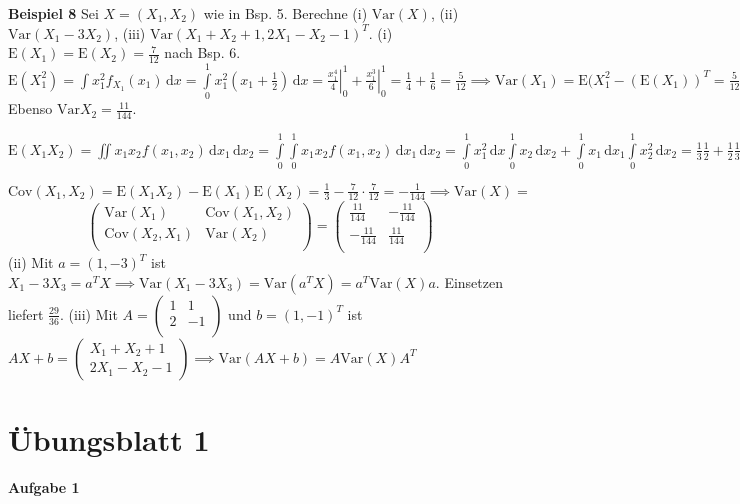 \documentclass[12pt, a4paper]{article}
\newcommand{\E}{\mbox{I\negthinspace E}}
\theoremstyle{empty}
\newcommand{\1}{\mathds{1}}
\renewcommand{\E}{\mathrm{E}}
\newcommand{\Var}{\mathrm{Var}}
\newcommand{\Cov}{\mathrm{Cov}}
\renewcommand{\d}{\,\mathrm{d}}
\providecommand{\eval}[1]{\left. #1 \right|}
\begin{document}
\textbf{Beispiel 8} Sei $X = (X_1, X_2)$ wie in Bsp. 5. Berechne (i) $\Var(X)$, (ii) $\Var(X_1 - 3X_2)$, (iii) $\Var(X_1 + X_2 + 1, 2X_1 - X_2 - 1)^T$.
(i) $\E(X_1) = \E(X_2) = \frac{7}{12}$ nach Bsp. 6. \\
$\E(X_1^2) = \int x_1^2 f_{X_1}(x_1) \d x = \int\limits_0^1 x_1^2 (x_1 + \frac{1}{2}) \d x = \eval{\frac{x_1^4}{4}}_0^1 + \eval{\frac{x_1^3}{6}}_0^1
= \frac{1}{4} + \frac{1}{6} = \frac{5}{12} \implies \Var(X_1) = \E(X_1^2 - (\E(X_1))^T = \frac{5}{12} - (\frac{5}{12})^T = \frac{11}{144} $ Ebenso $\Var{X_2} = \frac{11}{144}.$

$\E(X_1 X_2) = \iint x_1 x_2 f(x_1, x_2) \d x_1 \d x_2 = \int\limits_0^1 \int\limits_0^1 x_1 x_2 f(x_1, x_2) \d x_1 \d x_2 = \int\limits_0^1 x_1^2 \d x \int\limits_0^1 x_2 \d x_2 + \int\limits_0^1 x_1 \d x_1 \int\limits_0^1 x_2^2 \d x_2 = \frac{1}{3} \frac{1}{2} + \frac{1}{2} \frac{1}{3} = \frac{1}{3}$

$\Cov(X_1, X_2) = \E(X_1 X_2) - \E(X_1) \E(X_2) = \frac{1}{3} - \frac{7}{12} \cdot \frac{7}{12} = -\frac{1}{144} \implies \Var(X) =$
\[ \begin{pmatrix}
\Var(X_1) & \Cov(X_1, X_2) \\
\Cov(X_2, X_1) & \Var(X_2) \\
\end{pmatrix}  =
\begin{pmatrix}
\frac{11}{144} & -\frac{11}{144}  \\
-\frac{11}{144} & \frac{11}{144} \\
\end{pmatrix} 
 \]
 (ii) Mit $a = (1, -3)^T$ ist $X_1 - 3X_3 = a^T X \implies \Var(X_1 - 3 X_3) =\Var(a^T X) = a^T \Var (X) a $. Einsetzen liefert $\frac{29}{36}$.
 (iii) Mit $A = \begin{pmatrix} 1 & 1 \\ 2 & - 1 \\ \end{pmatrix}$ und $ b = (1, -1)^T$ ist $AX + b = \begin{pmatrix} X_1 + X_2 + 1 \\ 2X_1 - X_2 - 1 \end{pmatrix}  \implies \Var(AX + b) = A \Var(X) A^T$




\section{Übungsblatt 1}

\textbf{Aufgabe 1} 
\end{document}
